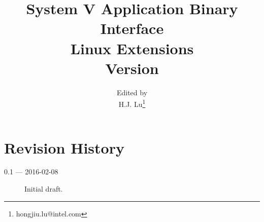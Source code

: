 \documentclass[12pt]{report}
\begin{document}
\author{Edited by\\
  H.J. Lu\thanks{hongjiu.lu@intel.com}}

\title{System V Application Binary Interface\\
{\Large Linux Extensions\\
Version \version}}
\maketitle
\tableofcontents
\listoftables
\listoffigures

\section*{Revision History}

\begin{description}

\item[0.1 --- 2016-02-08] Initial draft.
\end{description}






\appendix

\end{document}
